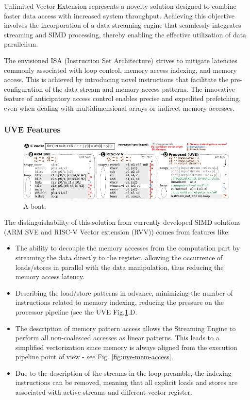 Unlimited Vector Extension \cite{uve-paper} represents a novelty solution designed to combine faster data access with increased system throughput. Achieving this objective involves the incorporation of a data streaming engine that seamlessly integrates streaming and SIMD processing, thereby enabling the effective utilization of data parallelism.

The envisioned ISA (Instruction Set Architecture) strives to mitigate latencies commonly associated with loop control, memory access indexing, and memory access. This is achieved by introducing novel instructions that facilitate the pre-configuration of the data stream and memory access patterns. The innovative feature of anticipatory access control enables precise and expedited prefetching, even when dealing with multidimensional arrays or indirect memory accesses.


\subsubsection{UVE Features}

\begin{figure}[H]
    \centering
    \includegraphics[width=\linewidth]{images/UVE-Comparison.pdf}
    \caption{A boat.}
    \label{fig:uve-comparison}
\end{figure}

The distinguishability of this solution from  currently developed SIMD solutions (ARM SVE and RISC-V Vector extension (RVV)) comes from features like:
\begin{itemize}
\item[]   The ability to decouple the memory accesses from the computation part by streaming the data directly to the register, allowing the occurrence of loads/stores in parallel with the data manipulation, thus reducing the memory access latency.
\item[]   Describing the load/store patterns in advance, minimizing the number of instructions related to memory indexing, reducing the pressure on the processor pipeline (see the UVE Fig.\ref{fig:uve-comparison}.D. 
\item[]   The description of memory pattern access allows the Streaming Engine to perform all non-coalesced accesses as linear patterns. This leads to a simplified vectorization since memory is always aligned from the execution pipeline point of view - see Fig. \ref{fig:uve-mem-access}. 
\item[]   Due to the description of the streams in the loop preamble, the indexing instructions can be removed, meaning that all explicit loads and stores are associated with active streams and different vector register.
\end{itemize}

